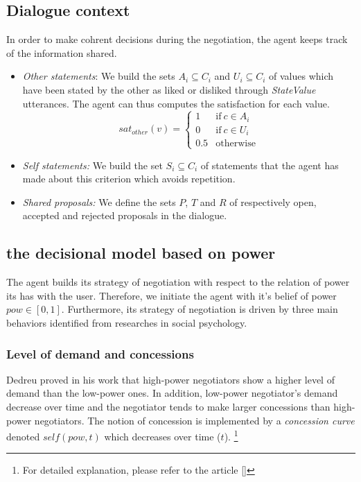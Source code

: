 \documentclass[runningheads,a4paper]{llncs}
\begin{document}
	\subsection{Dialogue context}
	In order to make cohrent decisions during the negotiation, the agent keeps track of the information shared. 
	\begin{itemize}
		\item \emph{Other statements}: We build the sets $A_i\subseteq C_i$ and $U_i\subseteq C_i$ of values which have been stated by the other as liked or disliked through \emph{StateValue} utterances. The agent can thus computes the satisfaction for each value.
		\vspace{-0.5em} 
		\begin{equation}
		sat_{other}(v)= \left\{\begin{array}{ll}
		1	 & \mathrm{if\ }  c \in A_i\\
		0    & \mathrm{if\ }c \in U_i\\
		0.5	 & \mathrm{otherwise}
		\end{array}\right.
		\end{equation}
		\vspace{-0.5em} 
		\item \emph{Self statements:} We build the set $S_i \subseteq C_i$ of statements that the agent has made about this criterion which avoids repetition.
		
		\item \emph{Shared proposals:} We define the sets $P$, $T$ and $R$ of respectively open, accepted and rejected proposals in the dialogue.
		
	\end{itemize}
	
	\subsection{the decisional model based on power}
	
	The agent builds its strategy of negotiation with respect to the relation of power its has with the user. Therefore, we initiate the agent with it's belief of power $pow \in [0,1]$. Furthermore, its strategy of negotiation is driven by three main behaviors identified from researches in social psychology. 
	\vspace{-0.5em} 
	\subsubsection{Level of demand and concessions}
	Dedreu proved in his work \cite{de1995impact} that high-power negotiators show a higher level of demand than the low-power ones. In addition, low-power negotiator's demand decrease over time and the negotiator tends to make larger concessions than high-power negotiators. 
	The notion of concession is implemented by a \emph{concession curve} denoted  $self(pow, t)$ which decreases over time ($t$). \footnote{For detailed explanation, please refer to the article []}
	
\end{document}
